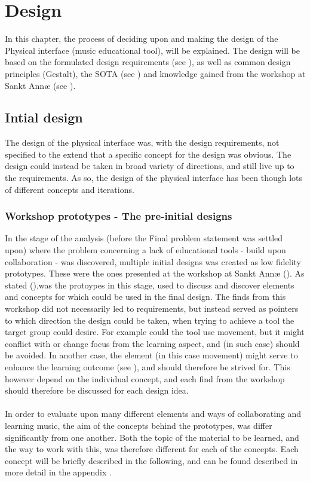 \chapter{Design}

In this chapter, the process of deciding upon and making the design of the Physical interface (music educational tool), will be explained. The design will be based on the formulated design requirements (see ), as well as common design principles (Gestalt), the SOTA (see ) and knowledge gained from the workshop at Sankt Annæ (see ). 


\section{Intial design}
The design of the physical interface was, with the design requirements, not specified to the extend that a specific concept for the design was obvious. The design could instead be taken in broad variety of directions, and still live up to the requirements. As so, the design of the physical interface has been though lots of different concepts and iterations. 

\subsection {Workshop prototypes - The pre-initial designs}
In the stage of the analysis (before the Final problem statement was settled upon) where the problem concerning a lack of educational tools - build upon collaboration - was discovered, multiple initial designs was created as low fidelity prototypes. These were the ones presented at the workshop at Sankt Annæ (). As stated (),was the protoypes in this stage, used to discuss and discover elements and concepts for which could be used in the final design. The finds from this workshop did not necessarily led to requirements, but instead served as pointers to which direction the design could be taken, when trying to achieve a tool the target group could desire. For example could the tool use movement, but it might conflict with or change focus from the learning aspect, and (in such case) should be avoided. In another case, the element (in this case movement) might serve to enhance the learning outcome (see ), and should therefore be strived for. This however depend on the individual concept, and each find from the workshop should therefore be discussed for each design idea. 
\\\\
In order to evaluate upon many different elements and ways of collaborating and learning music, the aim of the  concepts behind the prototypes, was differ significantly from one another. Both the topic of the material to be learned, and the way to work with this, was therefore different for each of the concepts. Each concept will be briefly described in the following, and can be found described in more detail in the appendix . 


